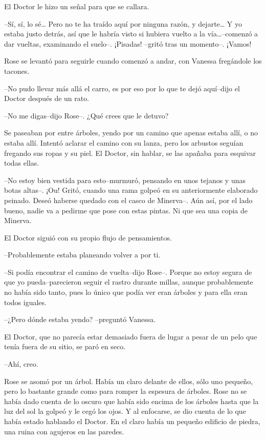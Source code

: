 El Doctor le hizo un señal para que se callara.

--Sí, sí, lo sé\ldots{} Pero no te ha traído aquí por ninguna razón, y
dejarte\ldots{} Y yo estaba justo detrás, así que le habría visto si
hubiera vuelto a la vía\ldots{}--comenzó a dar vueltas, examinando el
suelo--. ¡Pisadas! --gritó tras un momento--. ¡Vamos!

Rose se levantó para seguirle cuando comenzó a andar, con Vanessa
fregándole los tacones.

--No pudo llevar más allá el carro, es por eso por lo que te dejó
aquí--dijo el Doctor después de un rato.

--No me digas--dijo Rose--. ¿Qué crees que le detuvo?

Se paseaban por entre árboles, yendo por un camino que apenas estaba
allí, o no estaba allí. Intentó aclarar el camino con su lanza, pero los
arbustos seguían fregando sus ropas y su piel. El Doctor, sin hablar, se
las apañaba para esquivar todas ellas.

--No estoy bien vestida para esto--murmuró, pensando en unos tejanos y
unas botas altas--. ¡Ou! Gritó, cuando una rama golpeó en su
anteriormente elaborado peinado. Deseó haberse quedado con el casco de
Minerva--. Aún así, por el lado bueno, nadie va a pedirme que pose con
estas pintas. Ni que sea una copia de Minerva.

El Doctor siguió con su propio flujo de pensamientos.

--Probablemente estaba planeando volver a por ti.

--Si podía encontrar el camino de vuelta--dijo Rose--. Porque no estoy
segura de que yo pueda--parecieron seguir el rastro durante millas,
aunque probablemente no había sido tanto, pues lo único que podía ver
eran árboles y para ella eran todos iguales.

--¿Pero dónde estaba yendo? --preguntó Vanessa.

El Doctor, que no parecía estar demasiado fuera de lugar a pesar de un
pelo que tenía fuera de su sitio, se paró en seco.

--Ahí, creo.

Rose se asomó por un árbol. Había un claro delante de ellos, sólo uno
pequeño, pero lo bastante grande como para romper la espesura de
árboles. Rose no se había dado cuenta de lo oscuro que había sido encima
de los árboles hasta que la luz del sol la golpeó y le cegó los ojos. Y
al enfocarse, se dio cuenta de lo que había estado hablando el Doctor.
En el claro había un pequeño edificio de piedra, una ruina con agujeros
en las paredes.

